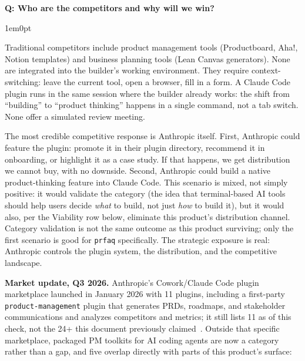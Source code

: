 \documentclass[11pt,letterpaper]{article}
\newcounter{faqnum}
\newenvironment{faqpair}[1]{%
  \needspace{4\baselineskip}%
  \vspace{0.5em}%
  \refstepcounter{faqnum}%
  \noindent\textbf{\color{SectionBlue}Q\thefaqnum: #1}\par\nopagebreak[4]%
  \vspace{0.2em}%
  \begin{adjustwidth}{1em}{0pt}%
  \setlength{\parindent}{0pt}%
}{%
  \end{adjustwidth}%
  \vspace{0.5em}%
}
\begin{document}
\begin{faqpair}{Who are the competitors and why will we win?}
  Traditional competitors include product management tools (Productboard, Aha!, Notion templates) and business planning tools (Lean Canvas generators). None are integrated into the builder's working environment. They require context-switching: leave the current tool, open a browser, fill in a form. A Claude Code plugin runs in the same session where the builder already works: the shift from ``building'' to ``product thinking'' happens in a single command, not a tab switch. None offer a simulated review meeting.

  The most credible competitive response is Anthropic itself. First, Anthropic could feature the plugin: promote it in their plugin directory, recommend it in onboarding, or highlight it as a case study. If that happens, we get distribution we cannot buy, with no downside. Second, Anthropic could build a native product-thinking feature into Claude Code. This scenario is mixed, not simply positive: it would validate the category (the idea that terminal-based AI tools should help users decide \textit{what} to build, not just \textit{how} to build it), but it would also, per the Viability row below, eliminate this product's distribution channel. Category validation is not the same outcome as this product surviving; only the first scenario is good for \texttt{prfaq} specifically. The strategic exposure is real: Anthropic controls the plugin system, the distribution, and the competitive landscape.

  \textbf{Market update, Q3 2026.} Anthropic's Cowork/Claude Code plugin marketplace launched in January 2026 with 11 plugins, including a first-party \texttt{product-management} plugin that generates PRDs, roadmaps, and stakeholder communications and analyzes competitors and metrics; it still lists 11 as of this check, not the 24+ this document previously claimed~\cite{anthropic2026knowledgeworkplugins}. Outside that specific marketplace, packaged PM toolkits for AI coding agents are now a category rather than a gap, and five overlap directly with parts of this product's surface:


\end{faqpair}
\end{document}
